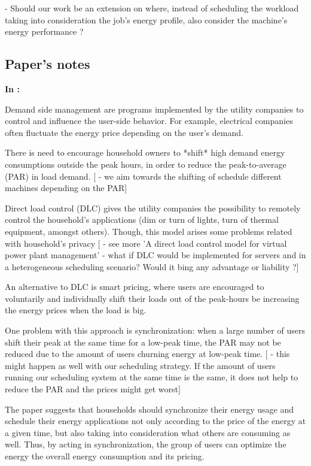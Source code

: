 - Should our work be an extension on \cite{DYN_PRICING_HPC} where, instead of
  scheduling the workload taking into consideration the job's energy profile,
  also consider the machine's energy performance ?



\subsection{Paper's notes}
\textbf{In \cite{FUTURE_SMART_GRID}:}

Demand side management are programs implemented by the utility companies to
control and influence the user-side behavior. For example, electrical companies
often fluctuate the energy price depending on the user's demand.

There is need to encourage household owners to *shift* high demand energy
consumptions outside the peak hours, in order to reduce the peak-to-average
(PAR) in load demand.
[ - we aim towards the shifting of schedule different machines  depending on the PAR] 

Direct load control (DLC) gives the utility companies the possibility to
remotely control the household's applications (dim or turn of lights, turn of
thermal equipment, amongst others). Though, this model arises some problems
related with household's privacy
[ - see more  'A direct load control model for virtual power plant management'
  - what if DLC would be implemented for servers and in a heterogeneous
    scheduling scenario? Would it bing any advantage or liability ?]

An alternative to DLC is smart pricing, where users are encouraged to
voluntarily and individually shift their loads out of the peak-hours be
increasing the energy prices when the load is big.

One problem with this approach is synchronization: when a large number of users
shift their peak at the same time for a low-peak time, the PAR may not be
reduced due to the amount of users churning energy at low-peak time.
[ - this might happen as well with our scheduling strategy. If the amount of
users running our scheduling system at the same time is the same, it does not
help to reduce the PAR and the prices might get worst]

The paper suggests that households should synchronize their energy usage and
schedule their energy applications not only according to the price of the energy
at a given time, but also taking into consideration what others are consuming as
well. Thus, by acting in synchronization, the group of users can optimize the
energy the overall energy consumption and its pricing. 

